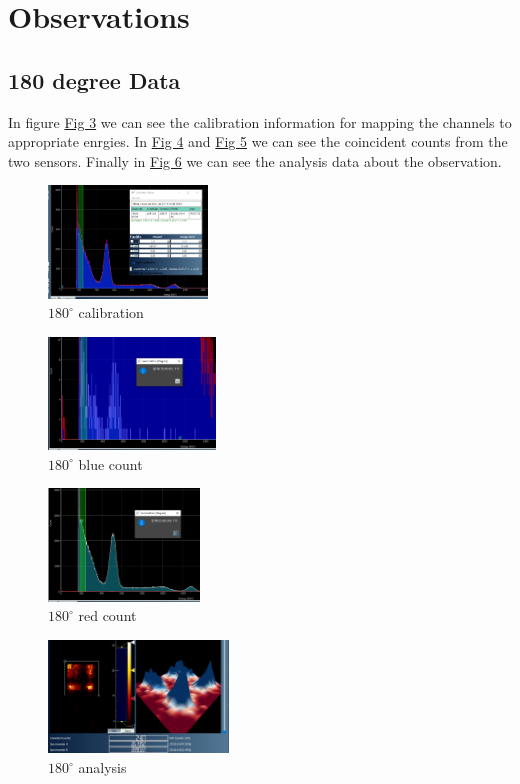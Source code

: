 \section{Observations}
	\subsection{180 degree Data}
		In figure \hyperref[obs:180cal]{Fig 3} we can see the calibration information for mapping the channels to appropriate enrgies. In \hyperref[obs:180blue]{Fig 4} and \hyperref[obs:180red]{Fig 5} we can see the coincident counts from the two sensors. Finally in \hyperref[obs:180]{Fig 6} we can see the analysis data about the observation.
		\begin{figure}[H]
			\centering
			\includegraphics[width=0.7\columnwidth, height=3cm]{images/180_cal.png}
			\caption{$180^\circ$ calibration}
			\label{obs:180cal}
		\end{figure}
		\begin{figure}[H]
			\centering
			\includegraphics[width=0.7\columnwidth, height=3cm]{images/180blue.png}
			\caption{$180^\circ$ blue count}
			\label{obs:180blue}
		\end{figure}
		\begin{figure}[H]
			\centering
			\includegraphics[width=0.7\columnwidth, height=3cm]{images/180red.png}
			\caption{$180^\circ$ red count}
			\label{obs:180red}
		\end{figure}
		\begin{figure}[H]
			\centering
			\includegraphics[width=0.7\columnwidth, height=3cm]{images/180.png}
			\caption{$180^\circ$ analysis}
			\label{obs:180}
		\end{figure}

